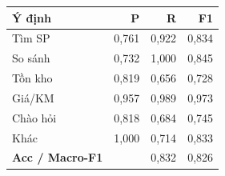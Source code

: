 \begin{tabular}{lrrr}
\toprule
Ý định & P & R & F1 \\
\midrule
Tìm SP & 0{,}761 & 0{,}922 & 0{,}834 \\
So sánh & 0{,}732 & 1{,}000 & 0{,}845 \\
Tồn kho & 0{,}819 & 0{,}656 & 0{,}728 \\
Giá/KM & 0{,}957 & 0{,}989 & 0{,}973 \\
Chào hỏi & 0{,}818 & 0{,}684 & 0{,}745 \\
Khác & 1{,}000 & 0{,}714 & 0{,}833 \\
\midrule
\textbf{Acc / Macro-F1} &  & 0{,}832 & 0{,}826 \\
\bottomrule
\end{tabular}
